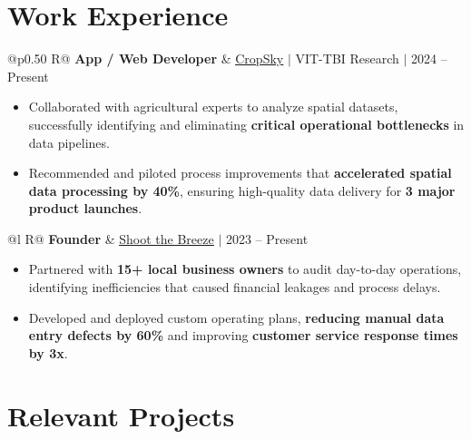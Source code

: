\documentclass[a4paper,10pt]{article}
\newcommand{\ulink}[2]{\href{#1}{\uline{#2}}}
\newcommand{\subheading}[1]{{\color[HTML]{0A0A0A}\fontsize{12}{14}\selectfont\bfseries #1}}
\newcommand{\meta}[1]{{\color[HTML]{5C5C5C}\fontsize{10.5}{12.5}\selectfont #1}}
\begin{document}
\section{Work Experience}
\vspace{2pt}

\begin{tabularx}{\linewidth}{@{}p{0.50\linewidth} R@{}}
\subheading{App / Web Developer} & \meta{\ulink{https://sites.google.com/view/cropsky/home}{CropSky} $|$ VIT-TBI Research $|$ 2024 -- Present}
\end{tabularx}
\begin{itemize}[nosep, leftmargin=1.5em, itemsep=1pt, topsep=2pt]
  \item {\color[HTML]{0A0A0A}\fontsize{11}{14}\selectfont Collaborated with agricultural experts to analyze spatial datasets, successfully identifying and eliminating \textbf{critical operational bottlenecks} in data pipelines.}
  \item {\color[HTML]{0A0A0A}\fontsize{11}{14}\selectfont Recommended and piloted process improvements that \textbf{accelerated spatial data processing by 40\%}, ensuring high-quality data delivery for \textbf{3 major product launches}.}
\end{itemize}

\vspace{2pt}

\begin{tabularx}{\linewidth}{@{}l R@{}}
\subheading{Founder} & \meta{\ulink{https://shoot-the-breeze.vercel.app}{Shoot the Breeze} $|$ 2023 -- Present}
\end{tabularx}
\begin{itemize}[nosep, leftmargin=1.5em, itemsep=1pt, topsep=2pt]
  \item {\color[HTML]{0A0A0A}\fontsize{11}{14}\selectfont Partnered with \textbf{15+ local business owners} to audit day-to-day operations, identifying inefficiencies that caused financial leakages and process delays.}
  \item {\color[HTML]{0A0A0A}\fontsize{11}{14}\selectfont Developed and deployed custom operating plans, \textbf{reducing manual data entry defects by 60\%} and improving \textbf{customer service response times by 3x}.}
\end{itemize}

\vspace{2pt}

\section{Relevant Projects}
\vspace{2pt}
\end{document}
